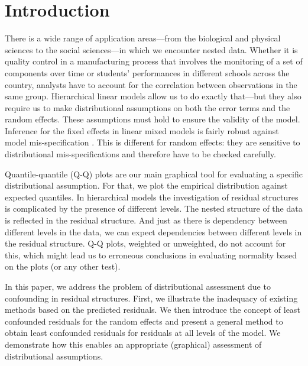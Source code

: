\documentclass{article} %
\begin{document}
\section{Introduction}\label{sec:intro}
There is a wide range of application areas---from the biological and physical sciences to the social sciences---in which we encounter nested  data.
Whether it is quality control in a manufacturing process that involves the monitoring of a set of components over  time  or students' performances in different schools across the country, analysts have to account for  the correlation between observations in the same group.  Hierarchical linear models allow us to do exactly that---but they also require us to 
 make distributional assumptions on both the error terms and the random effects.
 These assumptions must hold to ensure the validity of the model. Inference for the fixed effects in linear mixed models is fairly robust against model mis-specification \citep{Butler:1992tx, Verbeke:1997tf}. This is different for random effects: they are sensitive to  distributional mis-specifications and  therefore have to be checked carefully.

Quantile-quantile (Q-Q) plots \citep{Wilk:1968} are our main graphical tool for evaluating a specific distributional assumption. For that, we plot the empirical distribution against expected quantiles. In hierarchical models the investigation of residual structures is complicated by the presence of  different levels. 
The nested structure of the data is reflected in the residual structure. And just as there is dependency between different levels in the data, we can expect dependencies between different levels in the residual structure. Q-Q plots, weighted \citep{Dempster:1985tr, Lange:1989uu} or unweighted, do not account for this, which might lead us to erroneous conclusions in evaluating normality based on the plots (or any other test).



In this paper, we address the problem of distributional assessment due to confounding in residual structures. 
First, we illustrate the inadequacy of existing methods  based on the predicted residuals. 
We then introduce  the concept of least confounded residuals for the random effects and present a general method to obtain least confounded residuals for residuals at all levels of the model. We demonstrate how this enables an appropriate (graphical) assessment  of distributional assumptions.
% 
\end{document}
